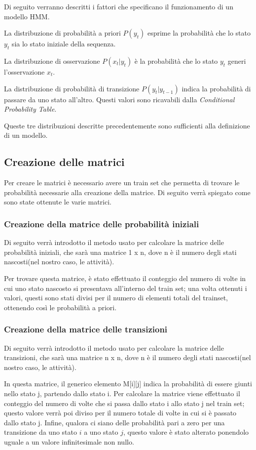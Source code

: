 \documentclass[10pt,a4paper]{article}
\begin{document}
Di seguito verranno descritti i fattori che specificano il funzionamento di un modello HMM.

La distribuzione di probabilità a priori $ P(y_{t}) $ esprime la probabilità che lo stato $ y_{t} $ sia lo stato iniziale della sequenza.

La distribuzione di osservazione $ P(x_{t} | y_{t}) $ è la probabilità che lo stato $ y_{t} $ generi l'osservazione $ x_{t} $.

La distribuzione di probabilità di transizione $ P(y_{t} | y_{t - 1}) $ indica la probabilità di passare da uno stato all'altro. Questi valori sono ricavabili dalla \textit{Conditional Probability Table}.

Queste tre distribuzioni descritte precedentemente sono sufficienti alla definizione di un modello.

\subsection{Creazione delle matrici}
Per creare le matrici è necessario avere un train set che permetta di trovare le probabilità necessarie alla creazione della matrice.
Di seguito verrà spiegato come sono state ottenute le varie matrici.

\subsubsection{Creazione della matrice delle probabilità iniziali}
Di seguito verrà introdotto il metodo usato per calcolare la matrice delle probabilità iniziali, che sarà una matrice  1 x n, dove n è il numero degli stati nascosti(nel nostro caso, le attività).

Per trovare questa matrice, è stato effettuato il conteggio del numero di volte in cui uno stato nascosto si presentava all'interno del train set; una volta ottenuti i valori, questi sono stati divisi per il numero di elementi totali del trainset, ottenendo così le probabilità a priori.

\subsubsection{Creazione della matrice delle transizioni}
Di seguito verrà introdotto il metodo usato per calcolare la matrice delle transizioni, che sarà una matrice  n x n, dove n è il numero degli stati nascosti(nel nostro caso, le attività).

In questa matrice, il generico elemento M[i][j] indica la probabilità di essere giunti nello stato j, partendo dallo stato i. Per calcolare la matrice viene effettuato il conteggio del numero di volte che si passa dallo stato i allo stato j nel train set; questo valore verrà poi diviso per il numero totale di volte in cui si è passato dallo stato j. Infine, qualora ci siano delle probabilità pari a zero per una transizione da uno stato $i$ a uno stato $j$, questo valore è stato alterato ponendolo uguale a un valore infinitesimale non nullo.
\end{document}
